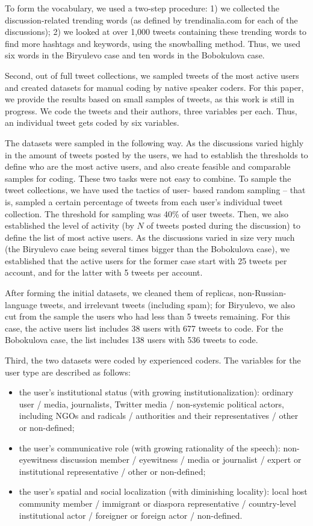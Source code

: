 To form the vocabulary, we used a two-step procedure: 1) we collected the discussion-related trending words (as defined by trendinalia.com for each of the discussions); 2) we looked at over 1,000 tweets containing these trending words to find more hashtags and keywords, using the snowballing method. Thus, we used six words in the Biryulevo case and ten words in the Bobokulova case.

Second, out of full tweet collections, we sampled tweets of the most active users and created datasets for manual coding by native speaker coders. For this paper, we provide the results based on small samples of tweets, as this work is still in progress. We code the tweets and their authors, three variables per each. Thus, an individual tweet gets coded by six variables.

The datasets were sampled in the following way. As the discussions varied highly in the amount of tweets posted by the users, we had to establish the thresholds to define who are the most active users, and also create feasible and comparable samples for coding. These two tasks were not easy to combine. To sample the tweet collections, we have used the tactics of user- based random sampling -- that is, sampled a certain percentage of tweets from each user’s individual tweet collection. The threshold for sampling was 40\% of user tweets. Then, we also established the level of activity (by \(N\) of tweets posted during the discussion) to define the list of most active users. As the discussions varied in size very much (the Biryulevo case being several times bigger than the Bobokulova case), we established that the active users for the former case start with 25 tweets per account, and for the latter with 5 tweets per account.

After forming the initial datasets, we cleaned them of replicas, non-Russian-language tweets, and irrelevant tweets (including spam); for Biryulevo, we also cut from the sample the users who had less than 5 tweets remaining. For this case, the active users list includes 38 users with 677 tweets to code. For the Bobokulova case, the list includes 138 users with 536 tweets to code.

Third, the two datasets were coded by experienced coders. The variables for the user type are described as follows:

\begin{itemize}
	\item the user’s institutional status (with growing institutionalization): ordinary user / media, journalists, Twitter media / non-systemic political actors, including NGOs and radicals / authorities and their representatives / other or non-defined;
	\item the user’s communicative role (with growing rationality of the speech): non-eyewitness discussion member / eyewitness / media or journalist / expert or institutional representative / other or non-defined;
	\item the user’s spatial and social localization (with diminishing locality): local host community member / immigrant or diaspora representative / country-level institutional actor / foreigner or foreign actor / non-defined.
\end{itemize}

